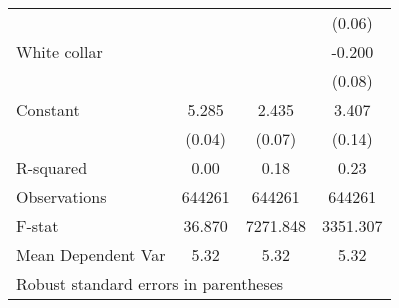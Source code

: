 {\begin{tabular}{l*{3}{c}}
                    &                     &                     &      (0.06)         \\
White collar        &                     &                     &      -0.200\sym{*}  \\
                    &                     &                     &      (0.08)         \\
Constant            &       5.285\sym{***}&       2.435\sym{***}&       3.407\sym{***}\\
                    &      (0.04)         &      (0.07)         &      (0.14)         \\
\hline
R-squared           &        0.00         &        0.18         &        0.23         \\
Observations        &      644261         &      644261         &      644261         \\
F-stat              &      36.870         &    7271.848         &    3351.307         \\
Mean Dependent Var  &        5.32         &        5.32         &        5.32         \\
\hline\hline
\multicolumn{4}{l}{\footnotesize Robust standard errors in parentheses}\\
\end{tabular}
}
